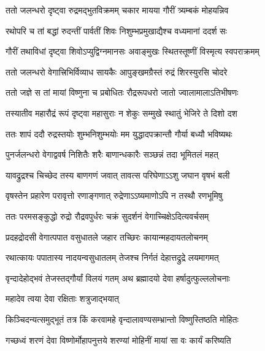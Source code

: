 \twolineshloka
{ततो जलन्धरो दृष्ट्वा रुद्रमद्भुतविक्रमम्}
{चकार मायया गौरीं त्र्यम्बकं मोहयन्निव} %

\twolineshloka
{रथोपरि च तां बद्धां रुदन्तीं पार्वतीं शिवः}
{निशुम्भप्रमुखाद्यैश्च वध्यमानां ददर्श सः} %

\twolineshloka
{गौरीं तथाविधां दृष्ट्वा शिवोऽप्युद्विग्नमानसः}
{अवाङ्मुखः स्थितस्तूष्णीं विस्मृत्य स्वपराक्रमम्} %

\twolineshloka
{ततो जलन्धरो वेगात्त्रिभिर्विव्याध सायकैः}
{आपुङ्खमग्रैस्तं रुद्रं शिरस्युरसि चोदरे} %

\twolineshloka
{ततो जज्ञे स तां मायां विष्णुना च प्रबोधितः}
{रौद्ररूपधरो जातो ज्वालामालाऽतिभीषणः} %

\twolineshloka
{तस्यातीव महारौद्रं रूपं दृष्ट्वा महासुराः}
{न शेकुः सम्मुखे स्थातुं भेजिरे ते दिशो दश} %

\twolineshloka
{ततः शापं ददौ रुद्रस्तयोः शुम्भनिशुम्भयोः}
{मम युद्धादपक्रान्तौ गौर्या बध्यौ भविष्यथः} %

\twolineshloka
{पुनर्जलन्धरो वेगाद्ववर्ष निशितैः शरैः}
{बाणान्धकारैः सञ्छन्नं तदा भूमितलं महत्} %

\twolineshloka
{यावद्रुद्रश्च चिच्छेद तस्य बाणगणं जवात्}
{तावत्स परिघेणाऽऽशु जघान वृषभं बली} %

\twolineshloka
{वृषस्तेन प्रहारेण परावृत्तो रणाङ्गणात्}
{रुद्रेणाऽऽष्यमाणोऽपि न तस्थौ रणभूमिषु} %

\twolineshloka
{ततः परमसङ्कुद्धो रुद्रो रौद्रवपुर्धरः}
{चक्रं सुदर्शनं वेगाच्चिक्षेऽदित्यवर्चसम्} %

\twolineshloka
{प्रदहद्रोदसी वेगात्पपात वसुधातले}
{जहार तच्छिरः कायान्महदायतलोचनम्} %

\twolineshloka
{रथात्कायः पपातास्य नादयन्वसुधातलम्}
{तेजश्च निर्गतं देहात्तद्रुद्रे लयमागमत्} %

\twolineshloka
{वृन्दादेहोद्भवं तेजस्तद्गौर्यां विलयं गतम्}
{अथ ब्रह्मादयो देवा हर्षादुत्फुल्ललोचनाः} %




\onelineshloka
{महादेव त्वया देवा रक्षिताः शत्रुजाद्भयात्} %

\twolineshloka
{किञ्चिदन्यत्समुद्भूतं तत्र किं करवामहे}
{वृन्दालावण्यसम्भ्रान्तो विष्णुस्तिष्ठति मोहितः} %


\twolineshloka
{गच्छध्वं शरणं देवा विष्णोर्मोहापनुत्तये}
{शरण्यां मोहिनीं मायां सा वः कार्यं करिष्यति} %


